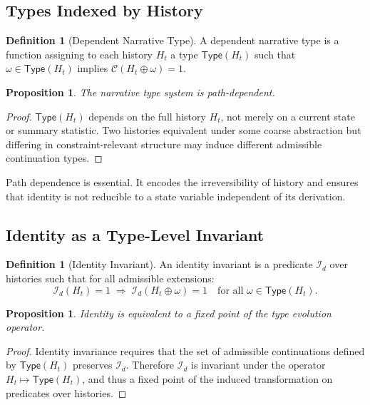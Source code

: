\documentclass[12pt, a4paper]{article}
\theoremstyle{plain}
\newtheorem{proposition}[theorem]{Proposition}
\theoremstyle{definition}
\newtheorem{definition}[theorem]{Definition}
\theoremstyle{remark}
\begin{document}
\subsection{Types Indexed by History}

\begin{definition}[Dependent Narrative Type]
A dependent narrative type is a function assigning to each history $H_t$ a type $\mathsf{Type}(H_t)$ such that $\omega \in \mathsf{Type}(H_t)$ implies $\mathcal{C}(H_t \oplus \omega) = 1$.
\end{definition}

\begin{proposition}
The narrative type system is path-dependent.
\end{proposition}

\begin{proof}
$\mathsf{Type}(H_t)$ depends on the full history $H_t$, not merely on a current state or summary statistic. Two histories equivalent under some coarse abstraction but differing in constraint-relevant structure may induce different admissible continuation types.
\end{proof}

Path dependence is essential. It encodes the irreversibility of history and ensures that identity is not reducible to a state variable independent of its derivation.

\subsection{Identity as a Type-Level Invariant}

\begin{definition}[Identity Invariant]
An identity invariant is a predicate $\mathcal{I}_d$ over histories such that for all admissible extensions:
\[
\mathcal{I}_d(H_t) = 1 \;\Rightarrow\; \mathcal{I}_d(H_t \oplus \omega) = 1 \quad \text{for all } \omega \in \mathsf{Type}(H_t).
\]
\end{definition}

\begin{proposition}
Identity is equivalent to a fixed point of the type evolution operator.
\end{proposition}

\begin{proof}
Identity invariance requires that the set of admissible continuations defined by $\mathsf{Type}(H_t)$ preserves $\mathcal{I}_d$. Therefore $\mathcal{I}_d$ is invariant under the operator $H_t \mapsto \mathsf{Type}(H_t)$, and thus a fixed point of the induced transformation on predicates over histories.
\end{proof}
\end{document}
